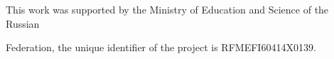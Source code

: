   





  


  












\Ack


\noindent


This work was supported by the Ministry of Education and Science of the Russian 


Federation, the unique identifier of the project is RFMEFI60414X0139.





\renewcommand{\bibname}{\protect\rmfamily References}







